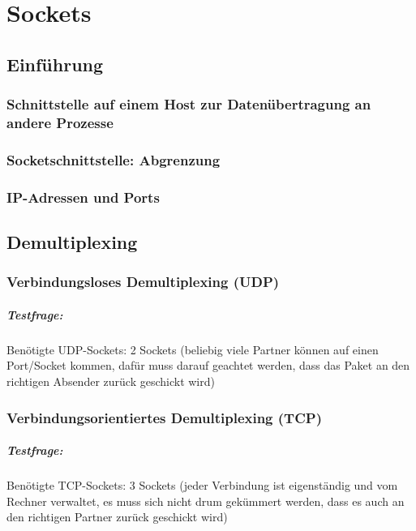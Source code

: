 \chapter{Sockets}

\section{Einführung}
\subsection{Schnittstelle auf einem Host zur Datenübertragung an andere Prozesse}
\subsection{Socketschnittstelle: Abgrenzung}
\subsection{IP-Adressen und Ports}
\section{Demultiplexing}
\subsection{Verbindungsloses Demultiplexing (UDP)}
\paragraph{Testfrage:} Benötigte UDP-Sockets: 2 Sockets (beliebig viele Partner können auf einen Port/Socket kommen, dafür muss darauf geachtet werden, dass das Paket an den richtigen Absender zurück geschickt wird)
\subsection{Verbindungsorientiertes Demultiplexing (TCP)}
\paragraph{Testfrage:} Benötigte TCP-Sockets: 3 Sockets (jeder Verbindung ist eigenständig und vom Rechner verwaltet, es muss sich nicht drum gekümmert werden, dass es auch an den richtigen Partner zurück geschickt wird)
